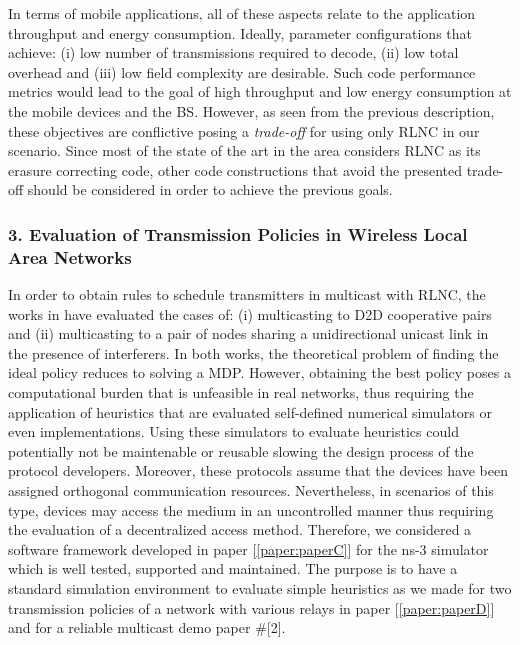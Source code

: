 In terms of mobile applications, all of these aspects relate to the application throughput and energy consumption. Ideally, parameter configurations that achieve: (i) low number of transmissions required to decode, (ii) low total overhead and (iii) low field complexity are desirable. Such code performance metrics would lead to the goal of high throughput and low energy consumption at the mobile devices and the \ac{BS}. However, as seen from the previous description, these objectives are conflictive posing a \textit{trade-off} for using only \ac{RLNC} in our scenario. Since most of the state of the art in the area considers \ac{RLNC} as its erasure correcting code, other code constructions that avoid the presented trade-off should be considered in order to achieve the previous goals.

\subsubsection{3. Evaluation of Transmission Policies in Wireless Local Area Networks}
In order to obtain rules to schedule transmitters in multicast with \ac{RLNC}, the works in \cite{khamfroush2013minimizing,khamfroush2015optimal,khamfroush2014coded} have evaluated the cases of: (i) multicasting to \ac{D2D} cooperative pairs and (ii) multicasting to a pair of nodes sharing a unidirectional unicast link in the presence of interferers. In both works, the theoretical problem of finding the ideal policy reduces to solving a \ac{MDP}. However, obtaining the best policy poses a computational burden that is unfeasible in real networks, thus requiring the application of heuristics that are evaluated self-defined numerical simulators or even implementations. Using these simulators to evaluate heuristics could potentially not be maintenable or reusable slowing the design process of the protocol developers. Moreover, these protocols assume that the devices have been assigned orthogonal communication resources. Nevertheless, in scenarios of this type, devices may access the medium in an uncontrolled manner thus requiring the evaluation of a decentralized access method. Therefore, we considered a software framework developed in paper {[\ref{paper:paperC}]} for the ns-3 simulator \cite{ns3link} which is well tested, supported and maintained. The purpose is to have a standard simulation environment to evaluate simple heuristics as we made for two transmission policies of a network with various relays in paper {[\ref{paper:paperD}]} and for a reliable multicast demo paper \#[2].

